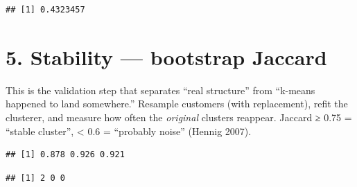 \documentclass[
]{article}
\newenvironment{Shaded}{\begin{snugshade}}{\end{snugshade}}
\newcommand{\AttributeTok}[1]{\textcolor[rgb]{0.13,0.29,0.53}{#1}}
\newcommand{\CommentTok}[1]{\textcolor[rgb]{0.56,0.35,0.01}{\textit{#1}}}
\newcommand{\ConstantTok}[1]{\textcolor[rgb]{0.56,0.35,0.01}{#1}}
\newcommand{\DecValTok}[1]{\textcolor[rgb]{0.00,0.00,0.81}{#1}}
\newcommand{\FunctionTok}[1]{\textcolor[rgb]{0.13,0.29,0.53}{\textbf{#1}}}
\newcommand{\NormalTok}[1]{#1}
\newcommand{\OtherTok}[1]{\textcolor[rgb]{0.56,0.35,0.01}{#1}}
\newcommand{\SpecialCharTok}[1]{\textcolor[rgb]{0.81,0.36,0.00}{\textbf{#1}}}
\newcommand{\StringTok}[1]{\textcolor[rgb]{0.31,0.60,0.02}{#1}}
\begin{document}
\begin{verbatim}
## [1] 0.4323457
\end{verbatim}

\section{5. Stability --- bootstrap
Jaccard}\label{stability-bootstrap-jaccard}

This is the validation step that separates ``real structure'' from
``k-means happened to land somewhere.'' Resample customers (with
replacement), refit the clusterer, and measure how often the
\emph{original} clusters reappear. Jaccard ≥ 0.75 = ``stable cluster'',
\textless{} 0.6 = ``probably noise'' (Hennig 2007).

\begin{Shaded}
\end{Shaded}

\begin{verbatim}
## [1] 0.878 0.926 0.921
\end{verbatim}

\begin{Shaded}
\end{Shaded}

\begin{verbatim}
## [1] 2 0 0
\end{verbatim}

\begin{Shaded}
\end{Shaded}
\end{document}
